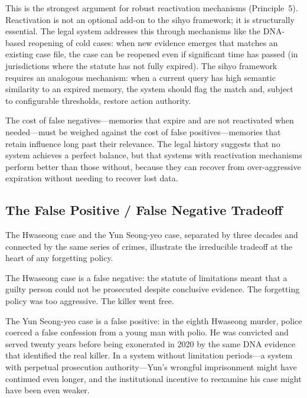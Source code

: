 \documentclass[12pt]{article}
\begin{document}
This is the strongest argument for robust reactivation mechanisms (Principle~5). Reactivation is not an optional add-on to the sihyo framework; it is structurally essential. The legal system addresses this through mechanisms like the DNA-based reopening of cold cases: when new evidence emerges that matches an existing case file, the case can be reopened even if significant time has passed (in jurisdictions where the statute has not fully expired). The sihyo framework requires an analogous mechanism: when a current query has high semantic similarity to an expired memory, the system should flag the match and, subject to configurable thresholds, restore action authority.

The cost of false negatives---memories that expire and are not reactivated when needed---must be weighed against the cost of false positives---memories that retain influence long past their relevance. The legal history suggests that no system achieves a perfect balance, but that systems with reactivation mechanisms perform better than those without, because they can recover from over-aggressive expiration without needing to recover lost data.

\subsection{The False Positive / False Negative Tradeoff}
\label{sec:tradeoff}

The Hwaseong case and the Yun Seong-yeo case, separated by three decades and connected by the same series of crimes, illustrate the irreducible tradeoff at the heart of any forgetting policy.

The Hwaseong case is a false negative: the statute of limitations meant that a guilty person could not be prosecuted despite conclusive evidence. The forgetting policy was too aggressive. The killer went free.

The Yun Seong-yeo case is a false positive: in the eighth Hwaseong murder, police coerced a false confession from a young man with polio. He was convicted and served twenty years before being exonerated in 2020 by the same DNA evidence that identified the real killer. In a system without limitation periods---a system with perpetual prosecution authority---Yun's wrongful imprisonment might have continued even longer, and the institutional incentive to reexamine his case might have been even weaker.
\end{document}
